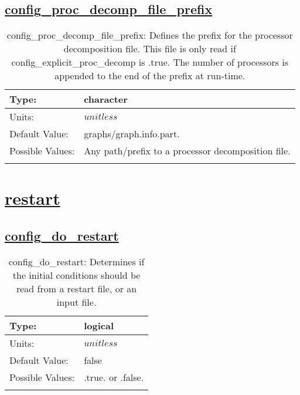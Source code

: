 \subsection[config\_proc\_decomp\_file\_prefix]{\hyperref[sec:nm_tab_decomposition]{config\_proc\_decomp\_file\_prefix}}
\label{subsec:nm_sec_config_proc_decomp_file_prefix}
\begin{center}
\begin{longtable}{| p{2.0in} || p{4.0in} |}
    \hline
    Type: & character \\
    \hline
    Units: & $unitless$ \\
    \hline
    Default Value: & graphs/graph.info.part. \\
    \hline
    Possible Values: & Any path/prefix to a processor decomposition file. \\
    \hline
    \caption{config\_proc\_decomp\_file\_prefix: Defines the prefix for the processor decomposition file. This file is only read if config\_explicit\_proc\_decomp is .true. The number of processors is appended to the end of the prefix at run-time.}
\end{longtable}
\end{center}
\section[restart]{\hyperref[sec:nm_tab_restart]{restart}}
\label{sec:nm_sec_restart}
\subsection[config\_do\_restart]{\hyperref[sec:nm_tab_restart]{config\_do\_restart}}
\label{subsec:nm_sec_config_do_restart}
\begin{center}
\begin{longtable}{| p{2.0in} || p{4.0in} |}
    \hline
    Type: & logical \\
    \hline
    Units: & $unitless$ \\
    \hline
    Default Value: & false \\
    \hline
    Possible Values: & .true. or .false. \\
    \hline
    \caption{config\_do\_restart: Determines if the initial conditions should be read from a restart file, or an input file.}
\end{longtable}
\end{center}
